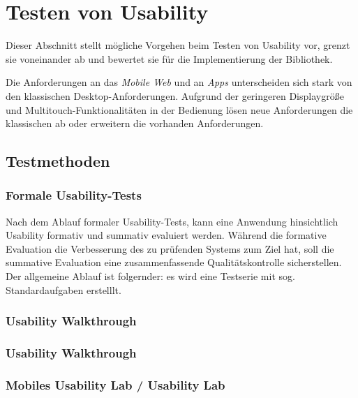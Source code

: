 \section{Testen von Usability}
\label{usability_testing}

Dieser Abschnitt stellt mögliche Vorgehen beim Testen von Usability vor, grenzt sie voneinander ab und bewertet sie für die Implementierung der Bibliothek. 

Die Anforderungen an das \textit{Mobile Web} und an \textit{Apps} unterscheiden sich stark von den klassischen Desktop-Anforderungen. Aufgrund der geringeren Displaygröße und Multitouch-Funktionalitäten in der Bedienung lösen neue Anforderungen die klassischen ab oder erweitern die vorhanden Anforderungen. 

\subsection{Testmethoden \label{sec_testmethoden}}

\subsubsection{Formale Usability-Tests}

Nach dem Ablauf formaler Usability-Tests, kann eine Anwendung hinsichtlich Usability formativ und summativ evaluiert werden. Während die formative Evaluation die Verbesserung des zu prüfenden Systems zum Ziel hat, soll die summative Evaluation eine zusammenfassende Qualitätskontrolle sicherstellen. 
Der allgemeine Ablauf ist folgernder: es wird eine Testserie mit sog. Standardaufgaben erstelllt. 

\subsubsection{Usability Walkthrough}

\subsubsection{Usability Walkthrough}

\subsubsection{Mobiles Usability Lab / Usability Lab}



\cite{usabilityblog_wasBeachten}

\cite{usabilityblog_eResult}